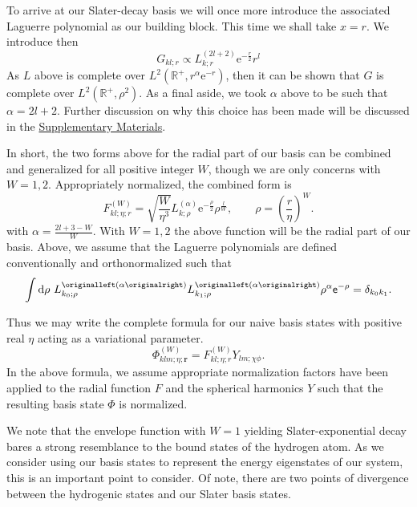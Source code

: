 To arrive at our Slater-decay basis we will once more introduce the associated
Laguerre polynomial as our building block. This time we shall take $x = r$.
We introduce then
\begin{equation}
  G_{kl;r}
  \propto
  L_{k;r}^{\left(2l+2\right)}
  \mathrm{e}^{-\frac{r}{2}}
  r^{l}
\end{equation}
As $L$ above is complete over
$L^{2}\left(\mathbb{R}^{+},r^\alpha\mathrm{e}^{-r}\right)$, then it can be
shown that $G$ is complete over $L^{2}\left(\mathbb{R}^{+},\rho^{2}\right)$. As
a final aside, we took $\alpha$ above to be such that $\alpha = 2l + 2$.
Further discussion on why this choice has been made will be discussed in
the \href{https://gitlab.com/cantankerous-impurity/Documentation/-/tree/core/SUNY--Buffalo/Dissertation/Supplementary%20Materials?ref_type=heads}{Supplementary Materials}.

In short, the two forms above for the radial part of our basis can be combined
and generalized for all positive integer $W$, though we are only concerns with
$W = 1,2$. Appropriately normalized, the combined form is
\begin{equation}
  F_{kl;\eta;r}^{\left(W\right)}
  =
  \sqrt{\frac{W}{\eta^{3}}}
  L_{k;\rho}^{\left(\alpha\right)}
  \mathrm{e}^{-\frac{\rho}{2}}
  \rho^{\frac{l}{W}},
  \quad\quad
  \rho = \left(\frac{r}{\eta}\right)^{W}
\label{naive_wf:radial_part}
.
\end{equation}
with $\alpha = \frac{2l+3-W}{W}$. With $W = 1,2$ the above function will be the
radial part of our basis. Above, we assume that the Laguerre polynomials are
defined conventionally and orthonormalized such that
\begin{equation}
\int\diff{\rho}\
L_{k_{0};\rho}^{\left(\alpha\right)}L_{k_{1};\rho}^{\left(\alpha\right)}
\rho^{\alpha}
\e^{-\rho}
  =
    \delta_{k_{0}k_{1}}
.
\end{equation}

Thus we may write the complete formula for our naive basis states with positive
real $\eta$ acting as a variational parameter.
\begin{equation}
  \Phi_{klm;\eta;\bm{r}}^{\left(W\right)}
  =
  F_{kl;\eta;r}^{\left(W\right)}
  Y_{lm;\chi\phi}.
  \label{basis-1}
\end{equation}
In the above formula, we assume appropriate normalization factors have been
applied to the radial function $F$ and the spherical harmonics $Y$ such that the
resulting basis state $\Phi$ is normalized.

We note that the envelope function with $W = 1$ yielding Slater-exponential
decay bares a strong resemblance to the bound states of the hydrogen atom. As we
consider using our basis states to represent the energy eigenstates of our
system, this is an important point to consider. Of note, there are two points of
divergence between the hydrogenic states and our Slater basis states.

